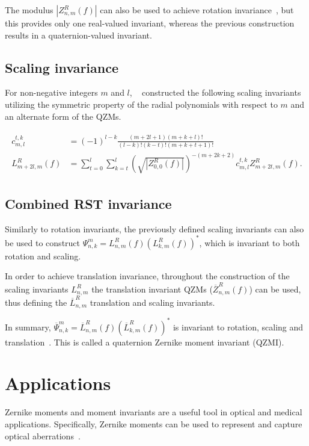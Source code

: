 The modulus $|Z_{n,m}^R(f)|$ can also be used to achieve rotation invariance~\cite{qzm}, but this provides only one real-valued invariant, whereas the previous construction results in a quaternion-valued invariant.

\subsection{Scaling invariance}
For non-negative integers $m$ and $l$, \citeauthor{qzmi}~\cite{qzmi} constructed the following scaling invariants utilizing the symmetric property of the radial polynomials with respect to $m$ and an alternate form of the QZMs.

\begin{gather*}
  \begin{split}
  c_{m,l}^{t,k} &= (-1)^{l-k}\frac{(m + 2l + 1)(m + k + l)!}{(l - k)!(k - t)!(m + k + t + 1)!} \\
  L_{m + 2l,m}^R(f) &= \sum_{t=0}^l\sum_{k=t}^l\left(\sqrt{|Z_{0,0}^R(f)|}\right)^{-(m+2k+2)}c_{m,l}^{t,k}Z_{m+2t,m}^R(f).
  \end{split}
\end{gather*}

\subsection{Combined RST invariance}
Similarly to rotation invariants, the previously defined scaling invariants can also be used to construct $\Psi_{n,k}^m = L_{n,m}^R(f)(L_{k,m}^R(f))^*$, which is invariant to both rotation and scaling.

In order to achieve translation invariance, throughout the construction of the scaling invariants $L_{n,m}^R$ the translation invariant QZMs ($\overline{Z}_{n,m}^R(f)$) can be used, thus defining the $\overline{L}_{n,m}^R$ translation and scaling invariants.

In summary, $\overline{\Psi}_{n,k}^m = \overline{L}_{n,m}^R(f)(\overline{L}_{k,m}^R(f))^*$ is invariant to rotation, scaling and translation~\cite{qzmi}. This is called a quaternion Zernike moment invariant (QZMI).

\section{Applications}
Zernike moments and moment invariants are a useful tool in optical and medical applications. Specifically, Zernike moments can be used to represent and capture optical aberrations~\cite{wavefront,optical_human_eye,opt_surf}.

